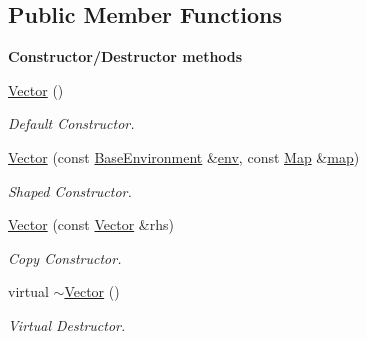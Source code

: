 \subsection*{Public Member Functions}
\begin{Indent}{\bf Constructor/\-Destructor methods}\par
\begin{DoxyCompactItemize}
\item 
\hyperlink{class_q_u_e_s_o_1_1_vector_aff103391923777d30d67f3d89706278b}{Vector} ()
\begin{DoxyCompactList}\small\item\em Default Constructor. \end{DoxyCompactList}\item 
\hyperlink{class_q_u_e_s_o_1_1_vector_a5fab5c1c4620c66c756615296b975505}{Vector} (const \hyperlink{class_q_u_e_s_o_1_1_base_environment}{Base\-Environment} \&\hyperlink{class_q_u_e_s_o_1_1_vector_a2e2952dab0554fedd8dc9a2543715745}{env}, const \hyperlink{class_q_u_e_s_o_1_1_map}{Map} \&\hyperlink{class_q_u_e_s_o_1_1_vector_a0cbedc1f6e24c0ad3b688d201fd649a4}{map})
\begin{DoxyCompactList}\small\item\em Shaped Constructor. \end{DoxyCompactList}\item 
\hyperlink{class_q_u_e_s_o_1_1_vector_a15d5af272c20e4309031f9be5338aba4}{Vector} (const \hyperlink{class_q_u_e_s_o_1_1_vector}{Vector} \&rhs)
\begin{DoxyCompactList}\small\item\em Copy Constructor. \end{DoxyCompactList}\item 
virtual \hyperlink{class_q_u_e_s_o_1_1_vector_a65d54b3eb14bbf47ba9a47dea27a103a}{$\sim$\-Vector} ()
\begin{DoxyCompactList}\small\item\em Virtual Destructor. \end{DoxyCompactList}\end{DoxyCompactItemize}
\end{Indent}
